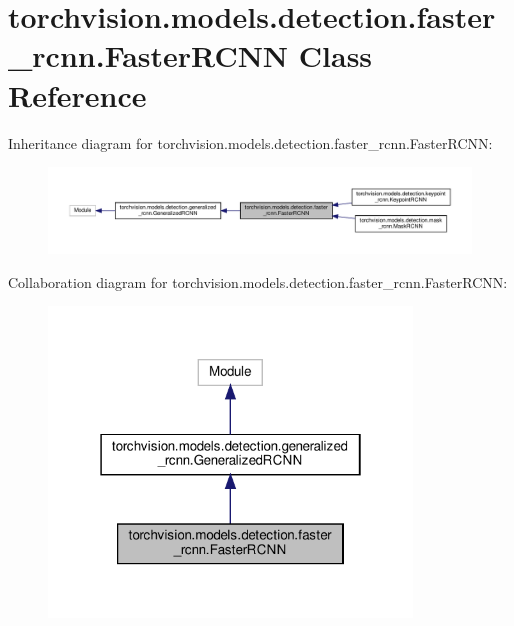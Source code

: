 \hypertarget{classtorchvision_1_1models_1_1detection_1_1faster__rcnn_1_1FasterRCNN}{}\section{torchvision.\+models.\+detection.\+faster\+\_\+rcnn.\+Faster\+R\+C\+NN Class Reference}
\label{classtorchvision_1_1models_1_1detection_1_1faster__rcnn_1_1FasterRCNN}


Inheritance diagram for torchvision.\+models.\+detection.\+faster\+\_\+rcnn.\+Faster\+R\+C\+NN\+:
\nopagebreak
\begin{figure}[H]
\begin{center}
\leavevmode
\includegraphics[width=350pt]{classtorchvision_1_1models_1_1detection_1_1faster__rcnn_1_1FasterRCNN__inherit__graph}
\end{center}
\end{figure}


Collaboration diagram for torchvision.\+models.\+detection.\+faster\+\_\+rcnn.\+Faster\+R\+C\+NN\+:
\nopagebreak
\begin{figure}[H]
\begin{center}
\leavevmode
\includegraphics[width=274pt]{classtorchvision_1_1models_1_1detection_1_1faster__rcnn_1_1FasterRCNN__coll__graph}
\end{center}
\end{figure}
